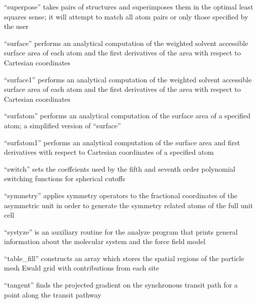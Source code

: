 \documentclass[letterpaper,11pt,english]{sphinxmanual}
\begin{document}
“superpose” takes pairs of structures and superimposes them
in the optimal least squares sense; it will attempt to match
all atom pairs or only those specified by the user


“surface” performs an analytical computation of the weighted
solvent accessible surface area of each atom and the first
derivatives of the area with respect to Cartesian coordinates


“surface1” performs an analytical computation of the weighted
solvent accessible surface area of each atom and the first
derivatives of the area with respect to Cartesian coordinates


“surfatom” performs an analytical computation of the surface
area of a specified atom; a simplified version of “surface”


“surfatom1” performs an analytical computation of the surface
area and first derivatives with respect to Cartesian coordinates
of a specified atom


“switch” sets the coeffcients used by the fifth and seventh
order polynomial switching functions for spherical cutoffs


“symmetry” applies symmetry operators to the fractional
coordinates of the asymmetric unit in order to generate
the symmetry related atoms of the full unit cell


“systyze” is an auxiliary routine for the analyze program
that prints general information about the molecular system
and the force field model


“table\_fill” constructs an array which stores the spatial
regions of the particle mesh Ewald grid with contributions
from each site


“tangent” finds the projected gradient on the synchronous
transit path for a point along the transit pathway
\end{document}
